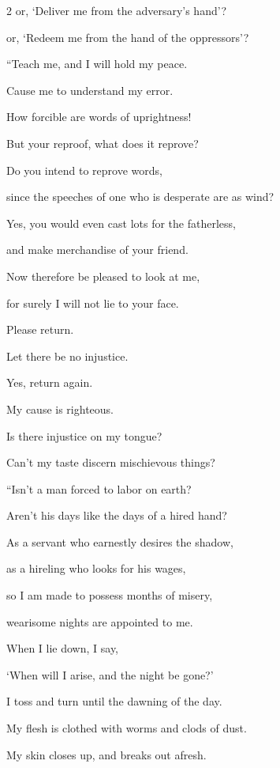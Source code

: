 \begin{multicols}{2}
	\myverse{}or, ‘Deliver me from the adversary’s hand’?
	
	or, ‘Redeem me from the hand of the oppressors’?
	
	\vspace{\baselineskip}
	
	
	\myverse{}“Teach me, and I will hold my peace.
	
	Cause me to understand my error.
	
	\myverse{}How forcible are words of uprightness!
	
	But your reproof, what does it reprove?
	
	\myverse{}Do you intend to reprove words,
	
	since the speeches of one who is desperate are as wind?
	
	\myverse{}Yes, you would even cast lots for the fatherless,
	
	and make merchandise of your friend.
	
	\myverse{}Now therefore be pleased to look at me,
	
	for surely I will not lie to your face.
	
	\myverse{}Please return.
	
	Let there be no injustice.
	
	Yes, return again.
	
	My cause is righteous.
	
	\myverse{}Is there injustice on my tongue?
	
	Can’t my taste discern mischievous things?
	
	
	
	\mychapter{} \myverse*{}“Isn’t a man forced to labor on earth?
	
	Aren’t his days like the days of a hired hand?
	
	\myverse{}As a servant who earnestly desires the shadow,
	
	as a hireling who looks for his wages,
	
	\myverse{}so I am made to possess months of misery,
	
	wearisome nights are appointed to me.
	
	\myverse{}When I lie down, I say,
	
	‘When will I arise, and the night be gone?’
	
	I toss and turn until the dawning of the day.
	
	\myverse{}My flesh is clothed with worms and clods of dust.
	
	My skin closes up, and breaks out afresh.
	

\end{multicols}
